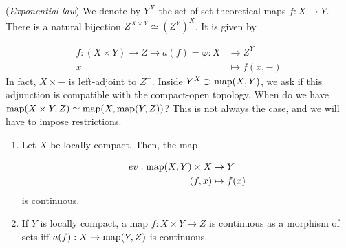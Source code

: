 \documentclass[main.tex]{subfiles}
\begin{document}
\begin{reminder}
	(\emph{Exponential law}) We denote by \(Y^X \) the set of set-theoretical maps \(f: X \to Y\).
	There is a natural bijection \(Z^{X \times Y} \simeq {\left(Z^{Y}\right)}^X \).
	It is given by


\begin{align*}
		f: (X \times Y) \to Z \mapsto a(f) = \varphi: X & \to Z^Y \\
		x & \mapsto f(x, -)

\end{align*}
	In fact, \(X \times -\) is left-adjoint to \(Z^- \).
	Inside \(Y^X \supset \operatorname{map}(X,Y)\), we ask if this adjunction is compatible with the compact-open topology.
	When do we have \(\operatorname{map}(X \times Y, Z) \simeq \operatorname{map}(X, \operatorname{map}(Y,Z))\)?
	This is not always the case, and we will have to impose restrictions.
\end{reminder}

\begin{prop}


\begin{enumerate}
		\item Let \(X\) be locally compact.
		 Then, the map


\begin{align*}
			 ev: \map(X,Y) \times X & \to Y \\
			 (f, x) & \mapsto f(x)

\end{align*}
		 is continuous.

		\item If \(Y\) is locally compact, a map \(f: X \times Y \to Z\) is continuous as a morphism of sets iff \(a(f): X \to \operatorname{map}(Y,Z)\) is continuous.


\end{enumerate}
\end{prop}
\end{document}
